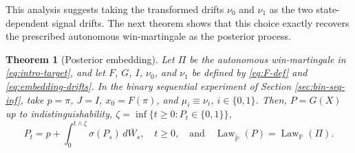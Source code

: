 \documentclass[11pt, reqno]{amsart}
\theoremstyle{plain}
\newtheorem{theorem}{Theorem}[section]
\theoremstyle{remark}
\numberwithin{equation}{section}
\begin{document}
This analysis suggests taking the transformed drifts $\nu_0$ and $\nu_1$ as the two state-dependent signal drifts. The next theorem shows that this choice exactly recovers the prescribed autonomous win-martingale as the posterior process.


\begin{theorem}[Posterior embedding]
\label{thm:posterior-embedding}
Let $\Pi$ be the autonomous win-martingale in
\eqref{eq:intro-target}, and let $F$, $G$, $I$, $\nu_0$, and $\nu_1$
be defined by \eqref{eq:F-def} and \eqref{eq:embedding-drifts}.
In the binary sequential experiment of
Section \ref{sec:bin-seq-inf}, take $p=\pi$, $J=I$, $x_0=F(\pi)$, and $\mu_i\equiv\nu_i$, $i\in\{0,1\}$.
Then, $P=G(X)$ up to indistinguishability,
$\zeta=\inf\{t\geq0:P_t\in\{0,1\}\}$,
\begin{equation}\label{eq:thm-P-embedding}
  P_t=p+\int_0^{t\wedge \zeta}\sigma(P_s)\,d\overline W_s, \quad t\geq0, \quad \text{and} \quad \operatorname{Law}_{\widetilde{\mathbb P}}(P)=\operatorname{Law}_{\mathbb P}(\Pi).
\end{equation}
\end{theorem}
\end{document}
